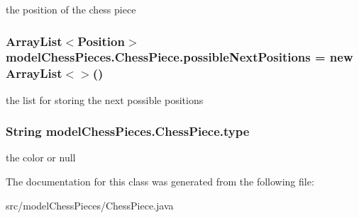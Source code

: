 the position of the chess piece \hypertarget{classmodel_chess_pieces_1_1_chess_piece_aa477ac8d33b4e7c98eb6f4aec2390477}{
\subsubsection[{possible\+Next\+Positions}]{\setlength{\rightskip}{0pt plus 5cm}Array\+List$<${\bf Position}$>$ model\+Chess\+Pieces.\+Chess\+Piece.\+possible\+Next\+Positions = new Array\+List$<$$>$()}}\label{classmodel_chess_pieces_1_1_chess_piece_aa477ac8d33b4e7c98eb6f4aec2390477}
the list for storing the next possible positions \hypertarget{classmodel_chess_pieces_1_1_chess_piece_a195487ca88c197af7c1604247be31db2}{
\subsubsection[{type}]{\setlength{\rightskip}{0pt plus 5cm}String model\+Chess\+Pieces.\+Chess\+Piece.\+type\hspace{0.3cm}{\ttfamily [protected]}}}\label{classmodel_chess_pieces_1_1_chess_piece_a195487ca88c197af7c1604247be31db2}
the color or null 

The documentation for this class was generated from the following file\+:\begin{DoxyCompactItemize}
\item 
src/model\+Chess\+Pieces/Chess\+Piece.\+java\end{DoxyCompactItemize}
